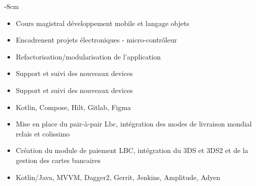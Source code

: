 \documentclass[10pt,a4paper]{altacv}
\begin{document}

\begin{adjustwidth}{}{-8cm}
\makecvheader
\end{adjustwidth}


\begin{itemize}
\item Cours magistral développement mobile et langage objets
\item Encadrenent projets électroniques - micro-contrôleur 
\end{itemize}

\divider

\begin{itemize}
\item Refactorisation/modularisation de l'application
\item Support et suivi des nouveaux devices
\item Support et suivi des nouveaux devices
\item Kotlin, Compose, Hilt, Gitlab, Figma
\end{itemize}

\divider

\begin{itemize}
\item Mise en place du pair-à-pair Lbc, intégration des modes de livraison mondial relais et colissimo 
\item Création du module de paiement LBC, intégration du 3DS et 3DS2 et de la gestion des cartes bancaires
\item Kotlin/Java, MVVM, Dagger2, Gerrit, Jenkins, Amplitude, Adyen 
\end{itemize}
\end{document}
